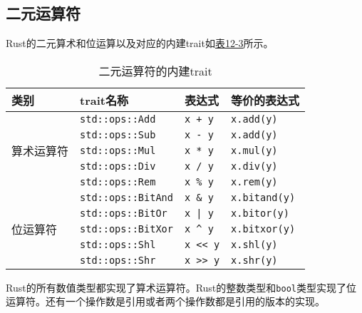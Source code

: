\subsection{二元运算符}\label{biop}
Rust的二元算术和位运算以及对应的内建trait如\hyperref[t12-3]{表12-3}所示。

\begin{table}[htbp]
    \centering
    \caption{二元运算符的内建trait}
    \label{t12-3}
    \begin{tabular}{llll}
        \hline
        \textbf{类别}   & \textbf{trait名称}    & \textbf{表达式}   & \textbf{等价的表达式} \\
        \hline

        \multirow{5}{*}{算术运算符} & \texttt{std::ops::Add}    & \texttt{x + y}    & \texttt{x.add(y)} \\
        & \texttt{std::ops::Sub} \cellcolor{tablecolor} & \texttt{x - y} \cellcolor{tablecolor} & \texttt{x.add(y)} \cellcolor{tablecolor}  \\
        & \texttt{std::ops::Mul}    & \texttt{x * y}    & \texttt{x.mul(y)} \\
        & \texttt{std::ops::Div} \cellcolor{tablecolor} & \texttt{x / y} \cellcolor{tablecolor} & \texttt{x.div(y)} \cellcolor{tablecolor}  \\
        & \texttt{std::ops::Rem}    & \texttt{x \% y}   & \texttt{x.rem(y)} \\

        \hline

        \multirow{5}{*}{位运算符}   & \texttt{std::ops::BitAnd} \cellcolor{tablecolor}  & \texttt{x \& y} \cellcolor{tablecolor}    & \texttt{x.bitand(y)} \cellcolor{tablecolor}   \\
        & \texttt{std::ops::BitOr}  & \texttt{x | y}    & \texttt{x.bitor(y)}   \\
        & \texttt{std::ops::BitXor} \cellcolor{tablecolor} & \texttt{x \^{} y} \cellcolor{tablecolor}   & \texttt{x.bitxor(y)} \cellcolor{tablecolor}   \\
        & \texttt{std::ops::Shl}    & \texttt{x << y}   & \texttt{x.shl(y)} \\
        & \texttt{std::ops::Shr} \cellcolor{tablecolor} & \texttt{x >> y} \cellcolor{tablecolor}    & \texttt{x.shr(y)} \cellcolor{tablecolor}  \\
    \end{tabular}
\end{table}

Rust的所有数值类型都实现了算术运算符。Rust的整数类型和\texttt{bool}类型实现了位运算符。还有一个操作数是引用或者两个操作数都是引用的版本的实现。

